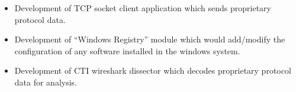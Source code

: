 \documentclass[letterpaper,10pt]{article}
\newcommand{\resitem}[1]{\item #1 \vspace{-2pt}}
\begin{document}
\begin{itemize}
	\begin{itemize}
	    \resitem{Development of TCP socket client application which sends proprietary protocol data.}
	    
	    \resitem{Development of “Windows Registry” module which would add/modify the configuration of any software installed in the windows system.}
	    
	    \resitem{Development of CTI wireshark dissector which decodes proprietary protocol data for analysis.}
	    
	\end{itemize}

\end{itemize}
\end{document}
